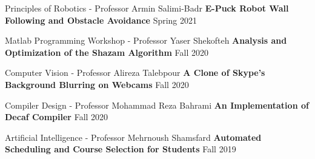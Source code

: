   \begin{cventries}
    
    \cventry
    {Principles of Robotics - Professor Armin Salimi-Badr}
    {\textbf {E-Puck Robot Wall Following and Obstacle Avoidance}}
    {}
    {Spring 2021}
    {}
    \vspace{0.0 cm}
  \end{cventries}
  \begin{cventries}
    
    \cventry
    {Matlab Programming Workshop - Professor Yaser Shekofteh}
    {\textbf {Analysis and Optimization of the Shazam Algorithm}}
    {}
    {Fall 2020}
    {}
    \vspace{0.0 cm}
  \end{cventries}
  \begin{cventries}
    
    \cventry
    {Computer Vision - Professor Alireza Talebpour}
    {\textbf {A Clone of Skype's Background Blurring on Webcams}}
    {}
    {Fall 2020}
    {}
    \vspace{0.0 cm}
  \end{cventries}
  \begin{cventries}

    \cventry
    {Compiler Design - Professor Mohammad Reza Bahrami}
    {\textbf {An Implementation of Decaf Compiler}}
    {}
    {Fall 2020}
    {}
    \vspace{0.0 cm}
  \end{cventries}
  \begin{cventries}

    \cventry
    {Artificial Intelligence - Professor Mehrnoush Shamsfard}
    {\textbf {Automated Scheduling and Course Selection for Students}}
    {}
    {Fall 2019}
    {}
    \vspace{0.0 cm}
  \end{cventries}
